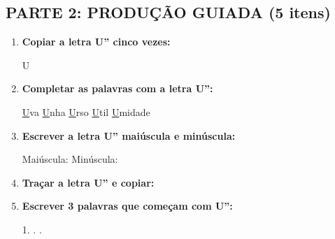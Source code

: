 \begin{exercicio}
\subsection*{PARTE 2: PRODUÇÃO GUIADA (5 itens)}

\begin{enumerate}[resume]
  \item \textbf{Copiar a letra U'' cinco vezes:}
  \begin{center}
  U \quad \underline{\hspace{1.5cm}} \quad \underline{\hspace{1.5cm}} \quad \underline{\hspace{1.5cm}} \quad \underline{\hspace{1.5cm}} \quad \underline{\hspace{1.5cm}}
  \end{center}

  \item \textbf{Completar as palavras com a letra U'':}
  \begin{center}
  \underline{U}va \quad \underline{U}nha \quad \underline{U}rso \quad \underline{U}til \quad \underline{U}midade
  \end{center}

  \item \textbf{Escrever a letra U'' maiúscula e minúscula:}
  \begin{center}
  Maiúscula: \underline{\hspace{2cm}} \quad Minúscula: \underline{\hspace{2cm}}
  \end{center}

  \item \textbf{Traçar a letra U'' e copiar:}
  \begin{center}
  \end{center}

  \item \textbf{Escrever 3 palavras que começam com U'':}
  \begin{center}
  1. \underline{\hspace{3cm}} . \underline{\hspace{3cm}} . \underline{\hspace{3cm}}
  \end{center}
\end{enumerate}


\end{exercicio}
